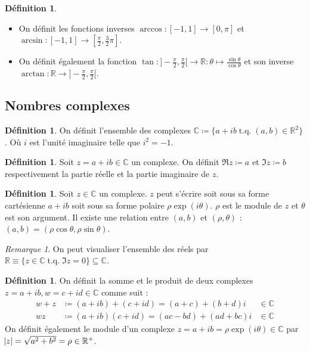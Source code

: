 \documentclass{article}
\DeclareMathOperator{\tq}{\text{ t.q. }}
\newcommand{\R}{\mathbb R}
\newcommand{\C}{\mathbb C}
\renewcommand{\interval}[2]{\left[#1, #2\right]}
\theoremstyle{definition}
\newtheorem{déf}[thm]{Définition}
\theoremstyle{remark}
\newtheorem*{rmq}{Remarque}
\begin{document}
		\begin{déf}~
		\begin{itemize}
			\item On définit les fonctions inverses $\arccos : \interval {-1}1 \to \interval 0\pi$ et $\arcsin : \interval {-1}1 \to \interval {\frac \pi2}{\frac 32\pi}$.
			\item On définit également la fonction $\tan : ]-\frac \pi2, \frac \pi2[ \to \R : \theta \mapsto \frac {\sin\theta}{\cos\theta}$ et son inverse
			      $\arctan : \R \to ]-\frac \pi2, \frac \pi2[$.
		\end{itemize}
		\end{déf}
	
	\subsection{Nombres complexes}
		\begin{déf} On définit l'ensemble des complexes $\C \coloneqq \{a + ib \tq (a, b) \in \R^2\}$. Où $i$ est l'unité imaginaire telle que $i^2 = -1$. \end{déf}
		
		\begin{déf} Soit $z = a + ib \in \C$ un complexe. On définit $\Re z \coloneqq a$ et $\Im z \coloneqq b$ respectivement la partie réelle et la partie imaginaire de $z$.
		\end{déf}

		\begin{déf} Soit $z \in \C$ un complexe. $z$ peut s'écrire soit sous sa forme cartésienne $a + ib$ soit sous sa forme polaire $\rho \exp(i\theta)$. $\rho$ est le module
		de $z$ et $\theta$ est son argument. Il existe une relation entre $(a, b)$ et $(\rho, \theta)$ : $(a, b) = (\rho\cos\theta, \rho\sin\theta)$. \end{déf}

		\begin{rmq} On peut visualiser l'ensemble des réels par $\R \equiv \{z \in \C \tq \Im z = 0\} \subseteq \C$. \end{rmq}

		\begin{déf} On définit la somme et le produit de deux complexes $z = a+ib, w = c + id \in \C$ comme suit :
		\begin{align*}
			w+z &\coloneqq (a+ib) + (c+id) = (a+c) + (b+d)i &\in \C \\
			w z &\coloneqq (a+ib)(c+id) = (ac - bd) + (ad+bc)i &\in \C
		\end{align*}
		On définit également le module d'un complexe $z = a+ib = \rho\exp(i\theta) \in \C$ par $\abs z = \sqrt {a^2+b^2} = \rho \in \R^+$. \end{déf}
\end{document}
